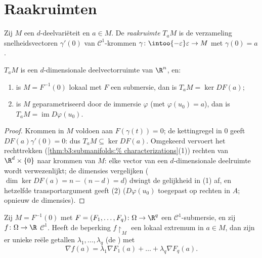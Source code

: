 \section{Raakruimten}

\begin{definition}\label{def:b3:submanifolds:tangent}
Zij $M$ een $d$-deelvariëteit en $a \in M$. De
\emph{raakruimte} $T_aM$ is de verzameling
snelheidsvectoren $\gamma'(0)$ van $\mathcal C^1$-krommen $\gamma
\colon \intoo{-\varepsilon}\varepsilon \to M$ met $\gamma(0) =
a$.
\end{definition}

\begin{proposition}\label{prop:b3:submanifolds:tangent}
$T_aM$ is een $d$-dimensionale deelvectorruimte van $\R^n$, en:
\begin{enumerate}
  \item is $M = F^{-1}(0)$ lokaal met $F$ een submersie, dan is
        $T_aM = \ker DF(a)$;
  \item is $M$ geparametriseerd door de immersie $\varphi$ (met
        $\varphi(u_0) = a$), dan is $T_aM =
        \operatorname{im}D\varphi(u_0)$.
\end{enumerate}
\end{proposition}

\begin{proof}
Krommen in $M$ voldoen aan $F(\gamma(t)) = 0$; de kettingregel in
$0$ geeft $DF(a)\gamma'(0) = 0$: dus $T_aM \subseteq \ker DF(a)$.
Omgekeerd vervoert het rechttrekken (\cref{thm:b3:submanifolds:%
characterizations}(1)) rechten van $\R^d\times\{0\}$ naar krommen
van $M$: elke vector van een $d$-dimensionale deelruimte wordt
verwezenlijkt; de dimensies vergelijken ($\dim\ker DF(a) = n - (n
- d) = d$) dwingt de gelijkheid in (1) af, en hetzelfde
transportargument geeft (2) ($D\varphi(u_0)$ toegepast op rechten
in $A$; opnieuw de dimensies).
\end{proof}

\begin{theorem}
\label{thm:b3:submanifolds:lagrange}
Zij $M = F^{-1}(0)$ met $F = (F_1, \dots, F_q) \colon \Omega \to
\R^q$ een $\mathcal C^1$-submersie, en zij $f \colon \Omega \to
\R$ $\mathcal C^1$. Heeft de beperking $f\restriction_M$ een
lokaal extremum in $a \in M$, dan zijn er unieke reële getallen
$\lambda_1, \dots, \lambda_q$ (de \emph{}) met
\[
\nabla f(a) = \lambda_1\nabla F_1(a) + \dots +
\lambda_q\nabla F_q(a) .
\]
\end{theorem}

